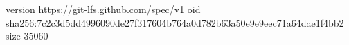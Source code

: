 version https://git-lfs.github.com/spec/v1
oid sha256:7c2c3d5dd4996090de27f317604b764a0d782b63a50e9e9eec71a64dae1f4bb2
size 35060
